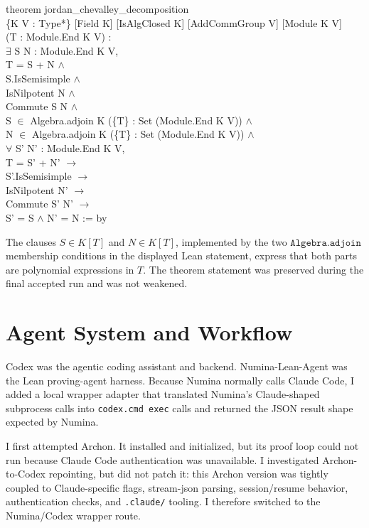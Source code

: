 \documentclass[12pt]{article}
\begin{document}
{\footnotesize\ttfamily\singlespacing
\begin{flushleft}
theorem jordan\_chevalley\_decomposition\\
\quad \{K V : Type*\} [Field K] [IsAlgClosed K] [AddCommGroup V] [Module K V]\\
\quad [FiniteDimensional K V] (T : Module.End K V) :\\
\quad $\exists$ S N : Module.End K V,\\
\quad\quad T = S + N $\land$\\
\quad\quad S.IsSemisimple $\land$\\
\quad\quad IsNilpotent N $\land$\\
\quad\quad Commute S N $\land$\\
\quad\quad S $\in$ Algebra.adjoin K (\{T\} : Set (Module.End K V)) $\land$\\
\quad\quad N $\in$ Algebra.adjoin K (\{T\} : Set (Module.End K V)) $\land$\\
\quad\quad $\forall$ S' N' : Module.End K V,\\
\quad\quad\quad T = S' + N' $\to$\\
\quad\quad\quad S'.IsSemisimple $\to$\\
\quad\quad\quad IsNilpotent N' $\to$\\
\quad\quad\quad Commute S' N' $\to$\\
\quad\quad\quad S' = S $\land$ N' = N := by
\end{flushleft}
}

The clauses \(S \in K[T]\) and \(N \in K[T]\), implemented by the two \(\texttt{Algebra.adjoin}\) membership conditions in the displayed Lean statement, express that both parts are polynomial expressions in \(T\). The theorem statement was preserved during the final accepted run and was not weakened.

\section{Agent System and Workflow}

Codex was the agentic coding assistant and backend. Numina-Lean-Agent was the Lean proving-agent harness. Because Numina normally calls Claude Code, I added a local wrapper adapter that translated Numina's Claude-shaped subprocess calls into \texttt{codex.cmd exec} calls and returned the JSON result shape expected by Numina.

I first attempted Archon. It installed and initialized, but its proof loop could not run because Claude Code authentication was unavailable. I investigated Archon-to-Codex repointing, but did not patch it: this Archon version was tightly coupled to Claude-specific flags, stream-json parsing, session/resume behavior, authentication checks, and \texttt{.claude/} tooling. I therefore switched to the Numina/Codex wrapper route.
\end{document}
